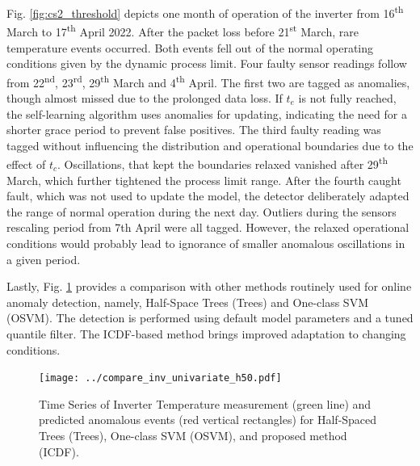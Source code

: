 Fig. \ref{fig:cs2_threshold} depicts one month of operation of the inverter from 16\textsuperscript{th} March to 17\textsuperscript{th} April 2022. After the packet loss before 21\textsuperscript{st} March, rare temperature events occurred. Both events fell out of the normal operating conditions given by the dynamic process limit. Four faulty sensor readings follow from 22\textsuperscript{nd}, 23\textsuperscript{rd}, 29\textsuperscript{th} March and 4\textsuperscript{th} April. The first two are tagged as anomalies, though almost missed due to the prolonged data loss. If $t_e$ is not fully reached, the self-learning algorithm uses anomalies for updating, indicating the need for a shorter grace period to prevent false positives. The third faulty reading was tagged without influencing the distribution and operational boundaries due to the effect of $t_c$. Oscillations, that kept the boundaries relaxed vanished after 29\textsuperscript{th} March, which further tightened the process limit range. After the fourth caught fault, which was not used to update the model, the detector deliberately adapted the range of normal operation during the next day. Outliers during the sensors rescaling period from 7th April were all tagged. However, the relaxed operational conditions would probably lead to ignorance of smaller anomalous oscillations in a given period.

Lastly, Fig. \ref{fig:comparison} provides a comparison with other methods routinely used for online anomaly detection, namely, Half-Space Trees (Trees) and One-class SVM (OSVM). The detection is performed using default model parameters and a tuned quantile filter. The ICDF-based method brings improved adaptation to changing conditions.
\begin{figure}[htbp]
 \centerline{\texttt{[image: ../compare\_inv\_univariate\_h50.pdf]}}
 \caption{Time Series of Inverter Temperature measurement (green line) and predicted anomalous events (red vertical rectangles) for Half-Spaced Trees (Trees), One-class SVM (OSVM), and proposed method (ICDF).}
 \label{fig:comparison}
\end{figure}